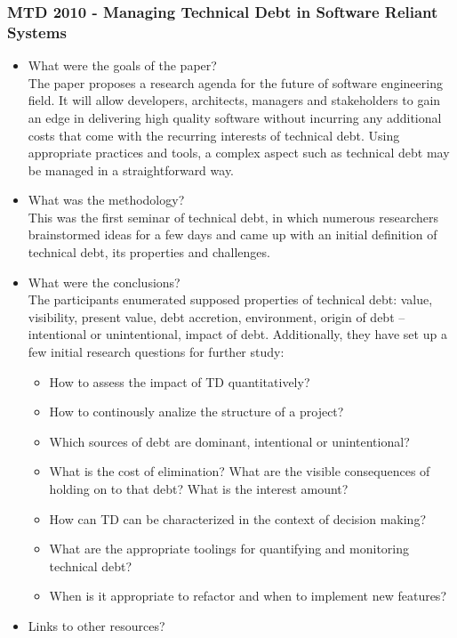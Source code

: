 \documentclass{mprop}
\begin{document}
\subsubsection{MTD 2010 - Managing Technical Debt in Software Reliant Systems} \cite{Brown2010}
\begin{itemize}
\item What were the goals of the paper? \\
The paper proposes a research agenda for the future of software engineering field. 
It will allow developers, architects, managers and stakeholders to gain an edge in delivering high quality software without incurring any additional costs that come with the recurring interests of technical debt. 
Using appropriate practices and tools, a complex aspect such as technical debt may be managed in a straightforward way. 
\item What was the methodology? \\
This was the first seminar of technical debt, in which numerous researchers brainstormed ideas for a few days and came up with an initial definition of technical debt, its properties and challenges.
\item What were the conclusions? \\
The participants enumerated supposed properties of technical debt: value, visibility, present value, debt accretion, environment, origin of debt – intentional or unintentional, impact of debt.
Additionally, they have set up a few initial research questions for further study:
\begin{itemize}
	\item How to assess the impact of TD quantitatively?
	\item How to continously analize the structure of a project?
	\item Which sources of debt are dominant, intentional or unintentional?
	\item What is the cost of elimination? What are the visible consequences of holding on to that debt? What is the interest amount?
	\item How can TD can be characterized in the context of decision making?
	\item What are the appropriate toolings for quantifying and monitoring technical debt?
	\item When is it appropriate to refactor and when to implement new features?
\end{itemize}
\item Links to other resources?
\end{itemize}
\end{document}
